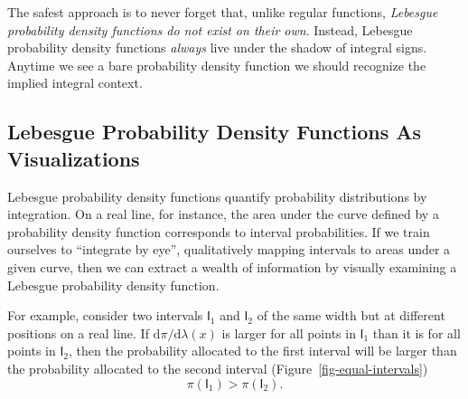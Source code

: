 \documentclass[
  letterpaper,
  DIV=11,
  numbers=noendperiod]{scrartcl}
\begin{document}
The safest approach is to never forget that, unlike regular functions,
\emph{Lebesgue probability density functions do not exist on their own}.
Instead, Lebesgue probability density functions \emph{always} live under
the shadow of integral signs. Anytime we see a bare probability density
function we should recognize the implied integral context.

\subsection{Lebesgue Probability Density Functions As
Visualizations}\label{sec:visualizing}

Lebesgue probability density functions quantify probability
distributions by integration. On a real line, for instance, the area
under the curve defined by a probability density function corresponds to
interval probabilities. If we train ourselves to ``integrate by eye'',
qualitatively mapping intervals to areas under a given curve, then we
can extract a wealth of information by visually examining a Lebesgue
probability density function.

For example, consider two intervals \(\mathsf{I}_{1}\) and
\(\mathsf{I}_{2}\) of the same width but at different positions on a
real line. If \(\mathrm{d} \pi / \mathrm{d} \lambda (x)\) is larger for
all points in \(\mathsf{I}_{1}\) than it is for all points in
\(\mathsf{I}_{2}\), then the probability allocated to the first interval
will be larger than the probability allocated to the second interval
(Figure~\ref{fig-equal-intervals}) \[
\pi(\mathsf{I}_{1}) > \pi(\mathsf{I}_{2}).
\]
\end{document}
